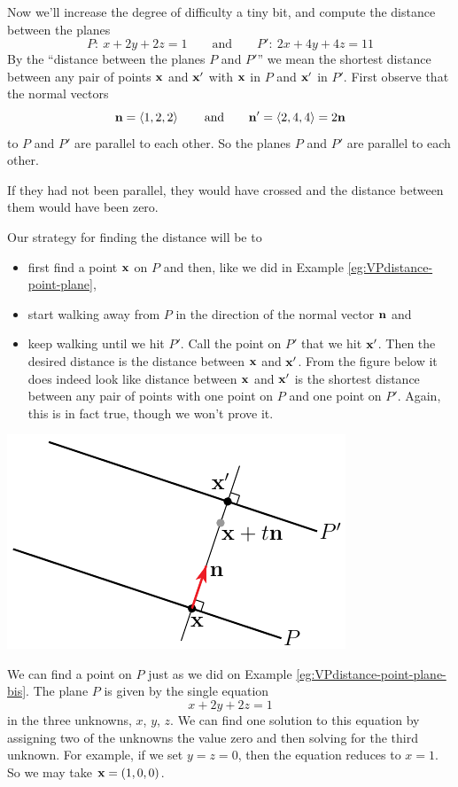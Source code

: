 \begin{eg}\label{eg:VPdistance-Planes}
Now we'll increase the degree of difficulty a tiny bit, and compute 
the distance between the planes
\begin{equation*}
P:\ x+2y+2z=1 \qquad\text{and}\qquad
P':\ 2x+4y+4z=11
\end{equation*}
By the ``distance between the planes $P$ and $P'$'' we mean the shortest
   distance between any pair of points $\mathbf{x}$ and $\mathbf{x}'$ with $\mathbf{x}$ in $P$
   and $\mathbf{x}'$ in $P'$.
First observe that the normal vectors
\begin{equation*}
\mathbf{n}=\left< 1,2,2\right> \qquad\text{and}\qquad
\mathbf{n}'=\left< 2,4,4\right>=2\mathbf{n}
\end{equation*}
to $P$ and $P'$ are parallel to each other. So the planes $P$ and $P'$ 
are parallel to each other.

If they had not been parallel, they would have crossed
and the distance between them would have been zero. 

Our strategy for finding the distance will be to
\begin{itemize}
\item first find a point $\mathbf{x}$ on $P$ and then, like we did in Example
\ref{eg:VPdistance-point-plane},
\item start walking away from $P$ in the 
direction of the normal vector $\mathbf{n}$ and
\item keep walking until we hit $P'$. Call the point on $P'$ that we hit
$\mathbf{x}'$. Then the desired distance is the distance between $\mathbf{x}$ and $\mathbf{x}'$.
From the figure below it does indeed look like distance between $\mathbf{x}$ and $\mathbf{x}'$
is the shortest distance between any pair of points with one point on $P$ and
one point on $P'$. Again, this is in fact true, though we won't prove it.
\end{itemize}
\begin{efig}
\begin{center}
   \includegraphics{planeDist.pdf}
\end{center}
\end{efig}
We can find a point on $P$ just as we did on Example \ref{eg:VPdistance-point-plane-bis}. The plane $P$ is given by the single equation
$$
x+2y+2z=1
$$ 
in the three unknowns, $x$, $y$, $z$. We can find one solution to this 
equation by assigning two of the unknowns the value zero and then 
solving for the third unknown. For example, if we
set $y=z=0$, then the equation reduces to $x=1$. So we may take
$\mathbf{x}=(1,0,0)$.


\end{eg}
